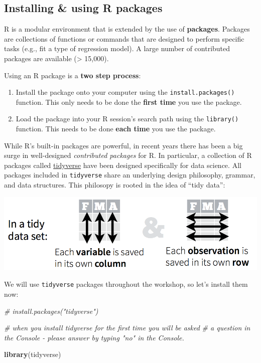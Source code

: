 \documentclass[]{book}
\newenvironment{Shaded}{\begin{snugshade}}{\end{snugshade}}
\newcommand{\CommentTok}[1]{\textcolor[rgb]{0.56,0.35,0.01}{\textit{#1}}}
\newcommand{\KeywordTok}[1]{\textcolor[rgb]{0.13,0.29,0.53}{\textbf{#1}}}
\newcommand{\NormalTok}[1]{#1}
\begin{document}
\hypertarget{installing-using-r-packages-1}{%
\subsection{Installing \& using R packages}\label{installing-using-r-packages-1}}

R is a modular environment that is extended by the use of \textbf{packages}.
Packages are collections of functions or commands that are designed to
perform specific tasks (e.g., fit a type of regression model). A large
number of contributed packages are available (\textgreater{} 15,000).

Using an R package is a \textbf{two step process}:

\begin{enumerate}
\def\labelenumi{\arabic{enumi}.}
\item
  Install the package onto your computer using the
  \texttt{install.packages()} function. This only needs to
  be done the \textbf{first time} you use the package.
\item
  Load the package into your R session's search path
  using the \texttt{library()} function. This needs to be done
  \textbf{each time} you use the package.
\end{enumerate}

While R's built-in packages are powerful, in recent years there has
been a big surge in well-designed \emph{contributed packages} for R.
In particular, a collection of R packages called
\href{https://www.tidyverse.org/}{tidyverse} have been
designed specifically for data science. All packages included in
\texttt{tidyverse} share an underlying design philosophy, grammar, and
data structures. This philosopy is rooted in the idea of ``tidy data'':

\includegraphics{R/Rintro/images/tidy_data.png}

We will use \texttt{tidyverse} packages throughout the
workshop, so let's install them now:

\begin{Shaded}
\begin{Highlighting}[]
\CommentTok{# install.packages("tidyverse")}

\CommentTok{# when you install tidyverse for the first time you will be asked}
\CommentTok{# a question in the Console - please answer by typing "no" in the Console.}

\KeywordTok{library}\NormalTok{(tidyverse)}
\end{Highlighting}
\end{Shaded}
\end{document}
